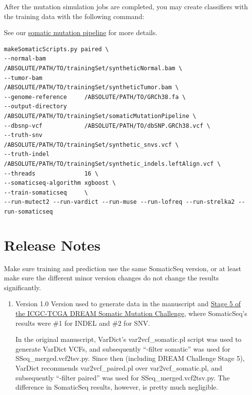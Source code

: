 \documentclass[10pt,letterpaper]{article}
\begin{document}
\begin{sloppypar}
After the mutation simulation jobs are completed, you may create classifiers with the training data with the following command:

See our \href{https://github.com/bioinform/somaticseq/blob/master/somaticseq/utilities/dockered_pipelines}{somatic mutation pipeline} for more details.

\begin{lstlisting}
makeSomaticScripts.py paired \
--normal-bam           /ABSOLUTE/PATH/TO/trainingSet/syntheticNormal.bam \
--tumor-bam            /ABSOLUTE/PATH/TO/trainingSet/syntheticTumor.bam \
--genome-reference     /ABSOLUTE/PATH/TO/GRCh38.fa \
--output-directory     /ABSOLUTE/PATH/TO/trainingSet/somaticMutationPipeline \
--dbsnp-vcf            /ABSOLUTE/PATH/TO/dbSNP.GRCh38.vcf \
--truth-snv            /ABSOLUTE/PATH/TO/trainingSet/synthetic_snvs.vcf \
--truth-indel          /ABSOLUTE/PATH/TO/trainingSet/synthetic_indels.leftAlign.vcf \
--threads              16 \
--somaticseq-algorithm xgboost \
--train-somaticseq     \
--run-mutect2 --run-vardict --run-muse --run-lofreq --run-strelka2 --run-somaticseq
\end{lstlisting}





\section{Release Notes}

Make sure training and prediction use the same SomaticSeq version, or at least make sure the different minor version changes do not change the results significantly. 


\begin{enumerate}


    \item Version 1.0
    Version used to generate data in the manuscript and \href{https://www.synapse.org/#!Synapse:syn312572/wiki/72943}{Stage 5 of the ICGC-TCGA DREAM Somatic Mutation Challenge}, where SomaticSeq's results were \#1 for INDEL and \#2 for SNV. 

    In the original manuscript, VarDict's var2vcf\_somatic.pl script was used to generate VarDict VCFs, and subsequently ``-filter somatic'' was used for SSeq\_merged.vcf2tsv.py. Since then (including DREAM Challenge Stage 5), VarDict recommends var2vcf\_paired.pl over var2vcf\_somatic.pl, and subsequently ``-filter paired'' was used for SSeq\_merged.vcf2tsv.py. The difference in SomaticSeq results, however, is pretty much negligible. 


\end{enumerate}
\end{sloppypar}
\end{document}
